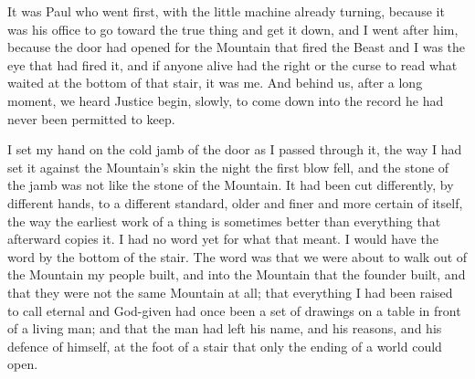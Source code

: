 It was Paul who went first, with the little machine already turning, because it was his office to go toward the true thing and get it down, and I went after him, because the door had opened for the Mountain that fired the Beast and I was the eye that had fired it, and if anyone alive had the right or the curse to read what waited at the bottom of that stair, it was me. And behind us, after a long moment, we heard Justice begin, slowly, to come down into the record he had never been permitted to keep.\par

I set my hand on the cold jamb of the door as I passed through it, the way I had set it against the Mountain's skin the night the first blow fell, and the stone of the jamb was not like the stone of the Mountain. It had been cut differently, by different hands, to a different standard, older and finer and more certain of itself, the way the earliest work of a thing is sometimes better than everything that afterward copies it. I had no word yet for what that meant. I would have the word by the bottom of the stair. The word was that we were about to walk out of the Mountain my people built, and into the Mountain that the founder built, and that they were not the same Mountain at all; that everything I had been raised to call eternal and God-given had once been a set of drawings on a table in front of a living man; and that the man had left his name, and his reasons, and his defence of himself, at the foot of a stair that only the ending of a world could open.\par
